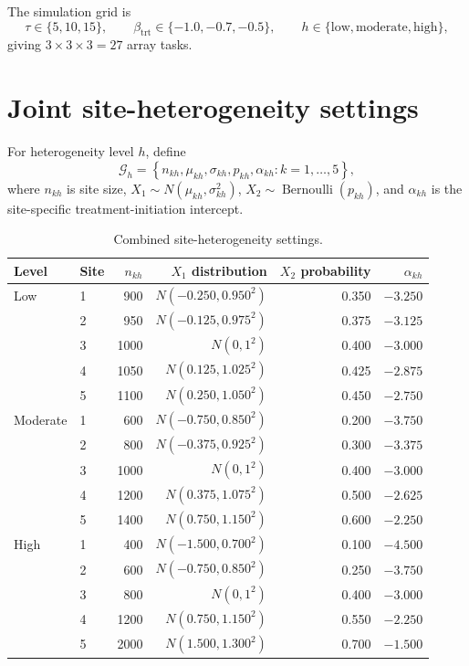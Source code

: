\documentclass[11pt]{article}
\begin{document}
The simulation grid is
\[
  \tau\in\{5,10,15\},\qquad
  \beta_{\mathrm{trt}}\in\{-1.0,-0.7,-0.5\},\qquad
  h\in\{\text{low},\text{moderate},\text{high}\},
\]
giving $3\times3\times3=27$ array tasks. 

\section{Joint site-heterogeneity settings}

For heterogeneity level $h$, define
\[
  \mathcal G_h
  =\left\{n_{kh},\mu_{kh},\sigma_{kh},p_{kh},\alpha_{kh}:
            k=1,\ldots,5\right\},
\]
where $n_{kh}$ is site size, $X_1\sim N(\mu_{kh},\sigma_{kh}^2)$,
$X_2\sim\operatorname{Bernoulli}(p_{kh})$, and $\alpha_{kh}$ is the
site-specific treatment-initiation intercept.

\begin{table}[ht]
\centering
\small
\caption{Combined site-heterogeneity settings.}
\begin{tabular}{llrrrr}
\toprule
Level & Site & $n_{kh}$ & $X_1$ distribution & $X_2$ probability & $\alpha_{kh}$ \\
\midrule
Low & 1 & 900  & $N(-0.250,0.950^2)$ & 0.350 & $-3.250$ \\
    & 2 & 950  & $N(-0.125,0.975^2)$ & 0.375 & $-3.125$ \\
    & 3 & 1000 & $N(0,1^2)$          & 0.400 & $-3.000$ \\
    & 4 & 1050 & $N(0.125,1.025^2)$  & 0.425 & $-2.875$ \\
    & 5 & 1100 & $N(0.250,1.050^2)$  & 0.450 & $-2.750$ \\
\addlinespace
Moderate & 1 & 600  & $N(-0.750,0.850^2)$ & 0.200 & $-3.750$ \\
         & 2 & 800  & $N(-0.375,0.925^2)$ & 0.300 & $-3.375$ \\
         & 3 & 1000 & $N(0,1^2)$          & 0.400 & $-3.000$ \\
         & 4 & 1200 & $N(0.375,1.075^2)$  & 0.500 & $-2.625$ \\
         & 5 & 1400 & $N(0.750,1.150^2)$  & 0.600 & $-2.250$ \\
\addlinespace
High & 1 & 400  & $N(-1.500,0.700^2)$ & 0.100 & $-4.500$ \\
     & 2 & 600  & $N(-0.750,0.850^2)$ & 0.250 & $-3.750$ \\
     & 3 & 800  & $N(0,1^2)$          & 0.400 & $-3.000$ \\
     & 4 & 1200 & $N(0.750,1.150^2)$  & 0.550 & $-2.250$ \\
     & 5 & 2000 & $N(1.500,1.300^2)$  & 0.700 & $-1.500$ \\
\bottomrule
\end{tabular}
\end{table}
\end{document}
